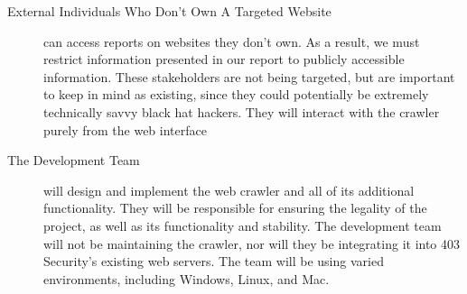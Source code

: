 \begin{description}
\item[External Individuals Who Don’t Own A Targeted Website] can access reports on websites they don’t own. As a result, we must restrict information presented in our report to publicly accessible information. These stakeholders are not being targeted, but are important to keep in mind as existing, since they could potentially be extremely technically savvy black hat hackers.  They will interact with the crawler purely from the web interface

\item[The Development Team] will design and implement the web crawler and all of its additional functionality.  They will be responsible for ensuring the legality of the project, as well as its functionality and stability.  The development team will not be maintaining the crawler, nor will they be integrating it into 403 Security’s existing web servers.  The team will be using varied environments, including Windows, Linux, and Mac.

\end{description}

